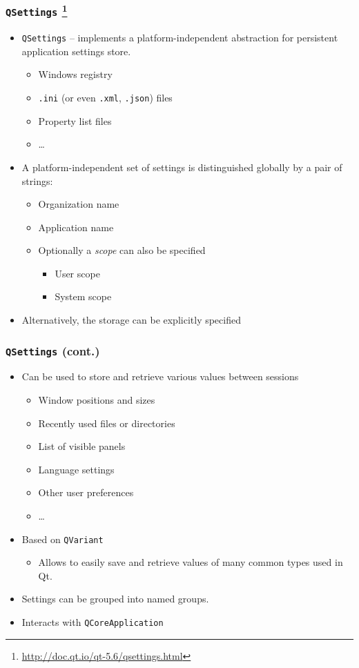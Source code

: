 \begin{frame}[fragile]
  \frametitle{\texttt{QSettings}
    \footnote{\url{http://doc.qt.io/qt-5.6/qsettings.html}}}
  \small
  \begin{itemize}
    \item \texttt{QSettings} -- implements a platform-independent abstraction
      for persistent application settings store.
      \begin{itemize}
        \item Windows registry
        \item \texttt{.ini} (or even \texttt{.xml}, \texttt{.json}) files
        \item Property list files
        \item \ldots
      \end{itemize}
    \item A platform-independent set of settings is distinguished globally by
      a pair of strings:
    \begin{itemize}
      \item Organization name
      \item Application name
      \item Optionally a {\em scope} can also be specified
      \begin{itemize}
        \item User scope
        \item System scope
      \end{itemize}
    \end{itemize}
    \item Alternatively, the storage can be explicitly specified
  \end{itemize}
\end{frame}

\begin{frame}
  \frametitle{\texttt{QSettings} (cont.)}
  \small
  \begin{itemize}
    \item Can be used to store and retrieve various values between sessions
    \begin{itemize}
      \item Window positions and sizes
      \item Recently used files or directories
      \item List of visible panels
      \item Language settings
      \item Other user preferences
      \item \ldots
    \end{itemize}
    \item Based on \texttt{QVariant}
    \begin{itemize}
      \item Allows to easily save and retrieve values of many common types used
        in Qt.
    \end{itemize}
    \item Settings can be grouped into named groups.
    \item Interacts with \texttt{QCoreApplication}
  \end{itemize}
\end{frame}

